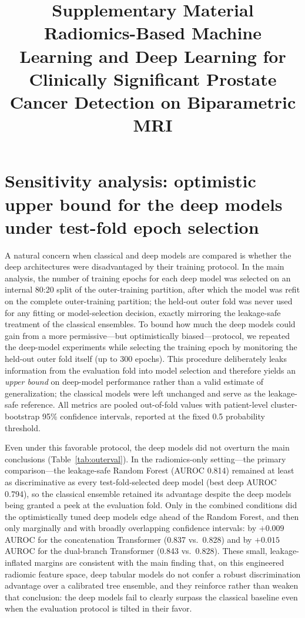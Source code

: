 \documentclass[11pt]{article}
\title{\textbf{Supplementary Material}\\[4pt]
Radiomics-Based Machine Learning and Deep Learning for Clinically Significant
Prostate Cancer Detection on Biparametric MRI}
\date{}
\begin{document}
\maketitle

\section{Sensitivity analysis: optimistic upper bound for the deep models
under test-fold epoch selection}
\label{app:outerval}

A natural concern when classical and deep models are compared is whether the
deep architectures were disadvantaged by their training protocol. In the main
analysis, the number of training epochs for each deep model was selected on an
internal 80:20 split of the outer-training partition, after which the model was
refit on the complete outer-training partition; the held-out outer fold was
never used for any fitting or model-selection decision, exactly mirroring the
leakage-safe treatment of the classical ensembles. To bound how much the deep
models could gain from a more permissive---but optimistically biased---protocol,
we repeated the deep-model experiments while selecting the training epoch by
monitoring the held-out outer fold itself (up to 300 epochs). This procedure
deliberately leaks information from the evaluation fold into model selection and
therefore yields an \emph{upper bound} on deep-model performance rather than a
valid estimate of generalization; the classical models were left unchanged and
serve as the leakage-safe reference. All metrics are pooled out-of-fold values
with patient-level cluster-bootstrap 95\% confidence intervals, reported at the
fixed 0.5 probability threshold.

Even under this favorable protocol, the deep models did not overturn the main
conclusions (Table~\ref{tab:outerval}). In the radiomics-only setting---the
primary comparison---the leakage-safe Random Forest (AUROC 0.814) remained at
least as discriminative as every test-fold-selected deep model (best deep AUROC
0.794), so the classical ensemble retained its advantage despite the deep models
being granted a peek at the evaluation fold. Only in the combined conditions did
the optimistically tuned deep models edge ahead of the Random Forest, and then
only marginally and with broadly overlapping confidence intervals: by
$+0.009$ AUROC for the concatenation Transformer (0.837 vs.\ 0.828) and by
$+0.015$ AUROC for the dual-branch Transformer (0.843 vs.\ 0.828). These small,
leakage-inflated margins are consistent with the main finding that, on this
engineered radiomic feature space, deep tabular models do not confer a robust
discrimination advantage over a calibrated tree ensemble, and they reinforce
rather than weaken that conclusion: the deep models fail to clearly surpass the
classical baseline even when the evaluation protocol is tilted in their favor.
\end{document}
